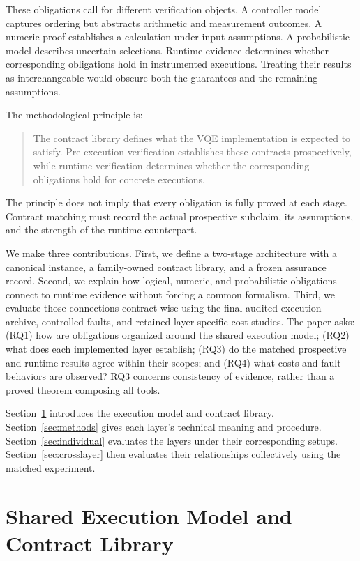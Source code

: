 \documentclass[conference]{IEEEtran}
\begin{document}
These obligations call for different verification objects. A controller model captures ordering but abstracts arithmetic and measurement outcomes. A numeric proof establishes a calculation under input assumptions. A probabilistic model describes uncertain selections. Runtime evidence determines whether corresponding obligations hold in instrumented executions. Treating their results as interchangeable would obscure both the guarantees and the remaining assumptions.

The methodological principle is:
\begin{quote}
The contract library defines what the VQE implementation is expected to satisfy. Pre-execution verification establishes these contracts prospectively, while runtime verification determines whether the corresponding obligations hold for concrete executions.
\end{quote}
The principle does not imply that every obligation is fully proved at each stage. Contract matching must record the actual prospective subclaim, its assumptions, and the strength of the runtime counterpart.

We make three contributions. First, we define a two-stage architecture with a canonical instance, a family-owned contract library, and a frozen assurance record. Second, we explain how logical, numeric, and probabilistic obligations connect to runtime evidence without forcing a common formalism. Third, we evaluate those connections contract-wise using the final audited execution archive, controlled faults, and retained layer-specific cost studies. The paper asks: (RQ1) how are obligations organized around the shared execution model; (RQ2) what does each implemented layer establish; (RQ3) do the matched prospective and runtime results agree within their scopes; and (RQ4) what costs and fault behaviors are observed? RQ3 concerns consistency of evidence, rather than a proved theorem composing all tools.

Section~\ref{sec:model} introduces the execution model and contract library. Section~\ref{sec:methods} gives each layer's technical meaning and procedure. Section~\ref{sec:individual} evaluates the layers under their corresponding setups. Section~\ref{sec:crosslayer} then evaluates their relationships collectively using the matched experiment.

\section{Shared Execution Model and Contract Library}
\label{sec:model}
\end{document}
